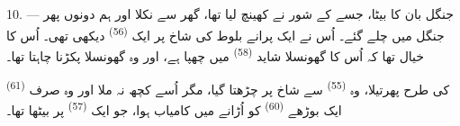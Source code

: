 10. --- جنگل بان کا بیٹا، جسے  کے شور نے کھینچ لیا
تھا، گھر سے نکلا اور ہم دونوں پھر جنگل میں چلے گئے۔ اُس نے ایک پرانے
بلوط کی شاخ پر ایک  \textsuperscript{(56)} دیکھی تھی۔
اُس کا خیال تھا کہ اُس کا گھونسلا شاید 
\textsuperscript{(58)} میں چھپا ہے، اور وہ گھونسلا پکڑنا چاہتا تھا۔

 \textsuperscript{(61)} کی طرح پھرتیلا، وہ 
\textsuperscript{(55)} سے شاخ پر چڑھتا گیا، مگر اُسے کچھ نہ ملا اور وہ
صرف ایک بوڑھے  \textsuperscript{(60)} کو اُڑانے میں کامیاب
ہوا، جو ایک  \textsuperscript{(57)} پر بیٹھا تھا۔

\VUsaut{4.0mm}
\VUfilet{22mm}
